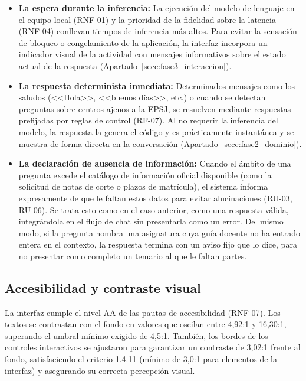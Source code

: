 \begin{itemize}
  \item \textbf{La espera durante la inferencia:} La ejecución del modelo de lenguaje en el equipo local (RNF-01) y la prioridad de la fidelidad sobre la latencia (RNF-04) conllevan tiempos de inferencia más altos. Para evitar la sensación de bloqueo o congelamiento de la aplicación, la interfaz incorpora un indicador visual de la actividad con mensajes informativos sobre el estado actual de la respuesta (Apartado~\ref{secc:fase3_interaccion}).

  \item \textbf{La respuesta determinista inmediata:} Determinados mensajes como los saludos (<<Hola>>, <<buenos días>>, etc.) o cuando se detectan preguntas sobre centros ajenos a la EPSJ, se resuelven mediante respuestas prefijadas por reglas de control (RF-07). Al no requerir la inferencia del modelo, la respuesta la genera el código y es prácticamente instantánea y se muestra de forma directa en la conversación (Apartado~\ref{secc:fase2_dominio}).

  \item \textbf{La declaración de ausencia de información:} Cuando el ámbito de una pregunta excede el catálogo de información oficial disponible (como la solicitud de notas de corte o plazos de matrícula), el sistema informa expresamente de que le faltan estos datos para evitar alucinaciones (RU-03, RU-06). Se trata esto como en el caso anterior, como una respuesta válida, integrándola en el flujo de chat sin presentarla como un error. Del mismo modo, si la pregunta nombra una asignatura cuya guía docente no ha entrado entera en el contexto, la respuesta termina con un aviso fijo que lo dice, para no presentar como completo un temario al que le faltan partes.
\end{itemize}




\subsection[Accesibilidad y contraste visual]{Accesibilidad y contraste visual}
\label{secc:fase3_accesibilidad}

La interfaz cumple el nivel AA de las pautas de accesibilidad  (RNF-07). Los textos se contrastan con el fondo en valores que oscilan entre 4,92:1 y 16,30:1, superando el umbral mínimo exigido de 4,5:1. También, los bordes de los controles interactivos se ajustaron para garantizar un contraste de 3,02:1 frente al fondo, satisfaciendo el criterio 1.4.11 (mínimo de 3,0:1 para elementos de la interfaz) y asegurando su correcta percepción visual.


